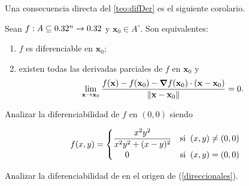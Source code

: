 Una consecuencia directa del \autoref{teo:difDer} es el siguiente corolario.
\begin{corollary}
 Sean $f: A  \subseteq  0.32^n \to 0.32$ y $\mathbf{x}_0 \in A^{\circ}$. Son equivalentes:
 \begin{enumerate} %
  \item $f$ es diferenciable en $\mathbf{x}_0$;
  \item existen todas las derivadas parciales de $f$ en $\mathbf{x}_0$ y 
  \[
   \lim_{\mathbf{x} \to \mathbf{x}_0} \frac{f(\mathbf{x}) - f(\mathbf{x}_0) - \grad f (\mathbf{x}_0) \cdot (\mathbf{x} - \mathbf{x}_0)}{\norm{\mathbf{x} - \mathbf{x}_0}} = 0.
  \]
 \end{enumerate}
\end{corollary}



 
\begin{tarea}  Analizar la diferenciabilidad de $f$  en $(0,0)$  siendo

 $$ f(x,y) = \begin{cases}   \dfrac{ x^{2}y^{2} }{ x^{2}y^{2}+(x-y)^{2}} & \text{si}\;\; (x,y) \neq (0,0) \\
           \hspace{0.5cm}0 & \text{si}\;\; (x,y) = (0,0)
          \end{cases}$$
\end{tarea}





\begin{tarea}
Analizar  la diferenciabilidad de en el origen de (\ref{direccionales}).
\end{tarea}






